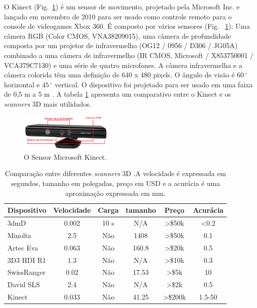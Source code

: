 O Kinect (Fig.~\ref{fig:kinect}) é um sensor de movimento, projetado pela Microsoft Inc. e lançado em novembro de 2010 para ser usado como controle remoto para o console de videogames Xbox 360. É composto por vários sensores (Fig. ~\ref{fig:kinect}): Uma câmera RGB (Color CMOS, VNA38209015), uma câmera de profundidade composta por um projetor de infravermelho (OG12 / 0956 / D306 / JG05A) combinado a uma câmera de infravermelho (IR CMOS, Microsoft / X853750001 / VCA379C7130) e uma série de quatro microfones. A câmera infravermelha e a câmera colorida têm uma definição de 640 x 480 pixels. O ângulo de visão é $60\,^{\circ}$ horizontal e $45\,^{\circ}$ vertical. O dispositivo foi projetado para ser usado em uma faixa de 0,5 m a 5 m \cite{sevrin2015characterization}. A tabela \ref{table:comparativoScanners} apresenta um comparativo entre o Kinect e os \textit{scanners} 3D mais utilidados.

 \begin{figure}[h]
\centering
    \includegraphics[resolution=300,width=0.4\textwidth,natwidth=610,natheight=642]{images/kinect.png}
    \caption{O Sensor Microsoft Kinect.}
    \label{fig:kinect}
\end{figure}


 \begin{table}[h]
 \caption{Comparação entre diferentes \textit{scanners} 3D \cite{li2013using}.\newline A velocidade é expressada em segundos, tamanho em polegadas, preço em USD e a acurácia é uma aproximação expressada em mm.}
 \label{table:comparativoScanners}
 \begin{tabular}{|l|c|c|c|c|c|}
\hline  
 Dispositivo & Velocidade & Carga & tamanho & Preço & Acurácia \\ \hline  
 3dmD & 0.002 & 10 s & N/A & >\$50k & <0.2 \\ \hline  
 Minolta & 2.5 & Não & 1408 & >\$50k & 0.1 \\ \hline  
 Artec Eva & 0.063 & Não & 160.8 & >\$20k & 0.5 \\ \hline  
 3D3 HDI R1 & 1.3 & Não & N/A & >\$10k & 0.3 \\ \hline  
 SwissRanger & 0.02 & Não & 17.53 & >\$5k & 10 \\ \hline  
 David SLS & 2.4 & Não & N/A & >\$2k & 0.5 \\ \hline  
 Kinect & 0.033 & Não & 41.25 & >\$200k & 1.5-50 \\ \hline
\end{tabular}
\end{table}



